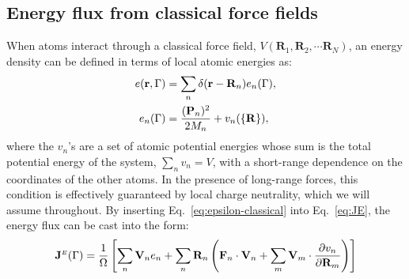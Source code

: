 \subsection{Energy flux from classical force fields}
When atoms interact through a classical force field, $V(\mathbf{R}_1,\mathbf{R}_2,\cdots \mathbf{R}_N)$, an energy density can be defined in terms of local atomic energies as:
\begin{align}
  e(\mathbf{r},\rGamma) &= \sum_n \delta(\mathbf{r}-\mathbf{R}_n) e_n(\rGamma), \label{eq:epsilon-classical} \\
  e_n(\rGamma) &= \frac{(\mathbf{P}_n)^2}{2M_n} + v_n(\{\mathbf{R}\}), \label{eq:atomic-energies}
\end{align}
where the $v_n$'s are a set of atomic potential energies whose sum is the total potential energy of the system, $\sum_n v_n=V$, with a short-range dependence on the coordinates of the other atoms. In the presence of long-range forces, this condition is effectively guaranteed by local charge neutrality, which we will assume throughout.
By inserting Eq.~\eqref{eq:epsilon-classical} into Eq.~\eqref{eq:JE}, the energy flux can be cast into the form:
\begin{equation}
  \mathbf{J}^\smallE(\rGamma) =
        \frac{1}{\rOmega} \left[ \sum_n \mathbf{V}_n e_n + \sum_n \mathbf{R}_n
        \left( \mathbf{F}_n \cdot \mathbf{V}_n  + \sum_m \mathbf{V}_m \cdot {\frac{\partial v_n}{\partial \mathbf{R}_m}} \right) \right] \label{eq:J-classical}
\end{equation}


